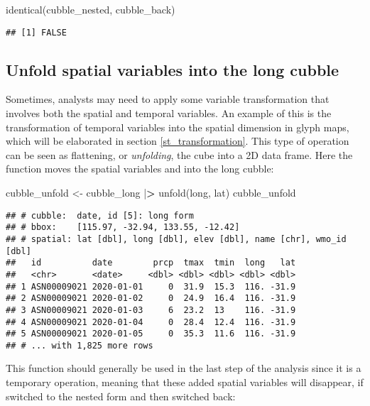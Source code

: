 \documentclass{article}
\newenvironment{Shaded}{\begin{snugshade}}{\end{snugshade}}
\newcommand{\ErrorTok}[1]{\textcolor[rgb]{0.64,0.00,0.00}{\textbf{#1}}}
\newcommand{\FunctionTok}[1]{\textcolor[rgb]{0.00,0.00,0.00}{#1}}
\newcommand{\NormalTok}[1]{#1}
\newcommand{\OtherTok}[1]{\textcolor[rgb]{0.56,0.35,0.01}{#1}}
\newcommand{\SpecialCharTok}[1]{\textcolor[rgb]{0.00,0.00,0.00}{#1}}
\begin{document}
\begin{Shaded}
\begin{Highlighting}[]
\FunctionTok{identical}\NormalTok{(cubble\_nested, cubble\_back)}
\end{Highlighting}
\end{Shaded}

\begin{verbatim}
## [1] FALSE
\end{verbatim}

\hypertarget{unfold}{%
\subsection{Unfold spatial variables into the long cubble}\label{unfold}}

Sometimes, analysts may need to apply some variable transformation that involves both the spatial and temporal variables. An example of this is the transformation of temporal variables into the spatial dimension in glyph maps, which will be elaborated in section \ref{st_transformation}. This type of operation can be seen as flattening, or \emph{unfolding}, the cube into a 2D data frame. Here the function  moves the spatial variables  and  into the long cubble:

\begin{Shaded}
\begin{Highlighting}[]
\NormalTok{cubble\_unfold }\OtherTok{\textless{}{-}}\NormalTok{ cubble\_long }\SpecialCharTok{|}\ErrorTok{\textgreater{}} \FunctionTok{unfold}\NormalTok{(long, lat)}
\NormalTok{cubble\_unfold}
\end{Highlighting}
\end{Shaded}

\begin{verbatim}
## # cubble:  date, id [5]: long form
## # bbox:    [115.97, -32.94, 133.55, -12.42]
## # spatial: lat [dbl], long [dbl], elev [dbl], name [chr], wmo_id [dbl]
##   id          date        prcp  tmax  tmin  long   lat
##   <chr>       <date>     <dbl> <dbl> <dbl> <dbl> <dbl>
## 1 ASN00009021 2020-01-01     0  31.9  15.3  116. -31.9
## 2 ASN00009021 2020-01-02     0  24.9  16.4  116. -31.9
## 3 ASN00009021 2020-01-03     6  23.2  13    116. -31.9
## 4 ASN00009021 2020-01-04     0  28.4  12.4  116. -31.9
## 5 ASN00009021 2020-01-05     0  35.3  11.6  116. -31.9
## # ... with 1,825 more rows
\end{verbatim}

This function should generally be used in the last step of the analysis since it is a temporary operation, meaning that these added spatial variables will disappear, if switched to the nested form and then switched back:
\end{document}

